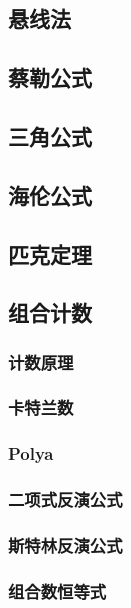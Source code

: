 \documentclass[twocolumn,a4]{article}
\newcommand{\addcpp}[1]{}
\begin{document}
	\subsection{悬线法}
	\subsection{蔡勒公式}
	\subsection{三角公式}
	\subsection{海伦公式}
	\subsection{匹克定理}
	\subsection{组合计数}
		\subsubsection{计数原理}
		\subsubsection{卡特兰数}
		\subsubsection{Polya}
		\subsubsection{二项式反演公式}
		\subsubsection{斯特林反演公式}
		\subsubsection{组合数恒等式}
			
\end{document}
